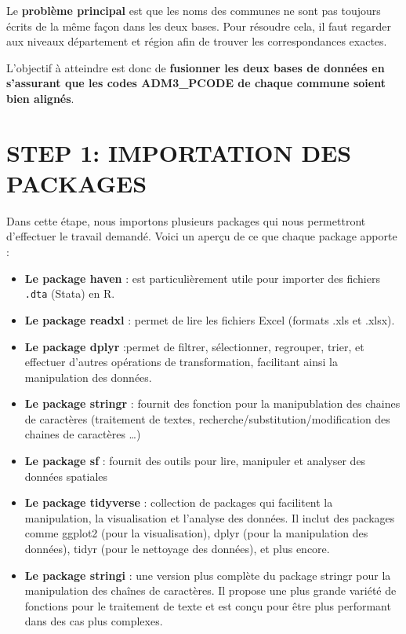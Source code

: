 \documentclass[
]{article}
\providecommand{\tightlist}{%
  \setlength{\itemsep}{0pt}\setlength{\parskip}{0pt}}
\begin{document}
Le \textbf{problème principal} est que les noms des communes ne sont pas
toujours écrits de la même façon dans les deux bases. Pour résoudre
cela, il faut regarder aux niveaux département et région afin de trouver
les correspondances exactes.

L'objectif à atteindre est donc de \textbf{fusionner les deux bases de
données en s'assurant que les codes ADM3\_PCODE de chaque commune soient
bien alignés}.

\newpage

\section{STEP 1: IMPORTATION DES
PACKAGES}\label{step-1-importation-des-packages}

Dans cette étape, nous importons plusieurs packages qui nous permettront
d'effectuer le travail demandé. Voici un aperçu de ce que chaque package
apporte :

\begin{itemize}
\tightlist
\item
  \textbf{Le package haven} : est particulièrement utile pour importer
  des fichiers \texttt{.dta} (Stata) en R.
\item
  \textbf{Le package readxl} : permet de lire les fichiers Excel
  (formats .xls et .xlsx).
\item
  \textbf{Le package dplyr} :permet de filtrer, sélectionner, regrouper,
  trier, et effectuer d'autres opérations de transformation, facilitant
  ainsi la manipulation des données.
\item
  \textbf{Le package stringr} : fournit des fonction pour la
  manipublation des chaines de caractères (traitement de textes,
  recherche/substitution/modification des chaines de caractères \ldots)
\item
  \textbf{Le package sf} : fournit des outils pour lire, manipuler et
  analyser des données spatiales
\item
  \textbf{Le package tidyverse} : collection de packages qui facilitent
  la manipulation, la visualisation et l'analyse des données. Il inclut
  des packages comme ggplot2 (pour la visualisation), dplyr (pour la
  manipulation des données), tidyr (pour le nettoyage des données), et
  plus encore.
\item
  \textbf{Le package stringi} : une version plus complète du package
  stringr pour la manipulation des chaînes de caractères. Il propose une
  plus grande variété de fonctions pour le traitement de texte et est
  conçu pour être plus performant dans des cas plus complexes.
\end{itemize}
\end{document}
